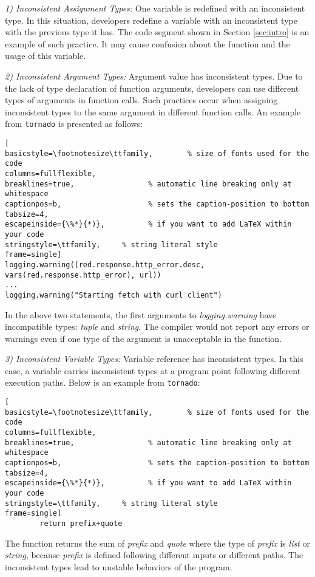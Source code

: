 \emph{1) Inconsistent Assignment Types:} One variable is redefined with an inconsistent type. In this situation, developers redefine a variable with an inconsistent type with the previous type it has. The code segment shown in Section \ref{sec:intro} is an example of such practice. It may cause confusion about the function and the usage of this variable.

\emph{2) Inconsistent Argument Types:} Argument value has inconsistent types. Due to the lack of type declaration of function arguments, developers can use different types of arguments in function calls. Such practices occur when assigning inconsistent types to the same argument in different function calls. An example from {\tt tornado}\cite{b37} is presented as follows:
\begin{lstlisting}[
basicstyle=\footnotesize\ttfamily,        % size of fonts used for the code
columns=fullflexible,
breaklines=true,                 % automatic line breaking only at whitespace
captionpos=b,                    % sets the caption-position to bottom
tabsize=4,
escapeinside={\%*}{*)},          % if you want to add LaTeX within your code
stringstyle=\ttfamily,     % string literal style
frame=single]
logging.warning((red.response.http_error.desc, vars(red.response.http_error), url))
...
logging.warning("Starting fetch with curl client")
\end{lstlisting}
\noindent In the above two statements, the first arguments to \textit{logging.warning} have incompatible types: \textit{tuple} and \textit{string}. The compiler would not report any errors or warnings even if one type of the argument is unacceptable in the function.

\emph{3) Inconsistent Variable Types:} Variable reference has inconsistent types. In this case, a variable carries inconsistent types at a program point following different execution paths. Below is an example from {\tt tornado}\cite{b37}:
\begin{lstlisting}[
basicstyle=\footnotesize\ttfamily,        % size of fonts used for the code
columns=fullflexible,
breaklines=true,                 % automatic line breaking only at whitespace
captionpos=b,                    % sets the caption-position to bottom
tabsize=4,
escapeinside={\%*}{*)},          % if you want to add LaTeX within your code
stringstyle=\ttfamily,     % string literal style
frame=single]
		return prefix+quote
\end{lstlisting}
\noindent The function returns the sum of \emph{prefix} and \emph{quote} where the type of \emph{prefix} is \textit{list} or \textit{string}, because \emph{prefix} is defined following different inputs or different paths. The inconsistent types lead to unstable behaviors of the program.

